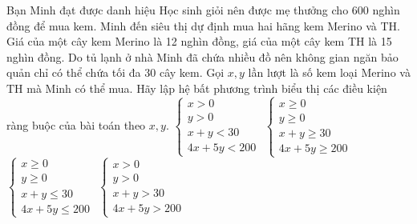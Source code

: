 \begin{ex}%
	Bạn Minh đạt được danh hiệu Học sinh giỏi nên được mẹ thưởng cho 600 nghìn đồng để mua kem. Minh đến siêu thị dự định mua hai hãng kem Merino và TH. Giá của một cây kem Merino là 12 nghìn đồng, giá của một cây kem TH là 15 nghìn đồng. Do tủ lạnh ở nhà Minh đã chứa nhiều đồ nên không gian ngăn bảo quản chỉ có thể chứa tối đa 30 cây kem. Gọi $ x, y $ lần lượt là số kem loại Merino và $\mathrm{TH}$ mà Minh có thể mua. Hãy lập hệ bất phương trình biểu thị các điều kiện ràng buộc của bài toán theo $ x, y $.
	\choice
	{$\left\{\begin{array}{l}x>0 \\ y>0 \\ x+y<30 \\ 4 x+5 y<200\end{array}\right.$}
	{$\left\{\begin{array}{l}x \geq 0 \\ y \geq 0 \\ x+y \geq 30 \\ 4 x+5 y \geq 200\end{array}\right.$}
	{\True $\left\{\begin{array}{l}x \geq 0 \\ y \geq 0 \\ x+y \leq 30 \\ 4 x+5 y \leq 200\end{array}\right.$}
	{$\left\{\begin{array}{l}x>0 \\ y>0 \\ x+y>30 \\ 4 x+5 y>200\end{array}\right.$}
\end{ex}

